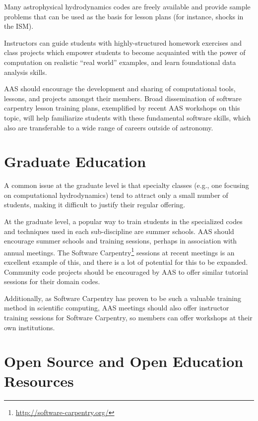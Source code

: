 \documentclass[11pt]{article}
\begin{document}
Many astrophysical hydrodynamics codes are freely available and
provide sample problems that can be used as the basis for lesson
plans (for instance, shocks in the ISM).

Instructors can guide students with highly-structured homework
exercises and class projects which empower students to become
acquainted with the power of computation on realistic ``real world''
examples, and learn foundational data analysis skills.

AAS should encourage the development and sharing of computational
tools, lessons, and projects amongst their members. Broad
dissemination of software carpentry lesson training plans, exemplified
by recent AAS workshops on this topic, will help familiarize students
with these fundamental software skills, which also are transferable to
a wide range of careers outside of astronomy.





\section{Graduate Education}

A common issue at the graduate level is that specialty classes (e.g.,
one focusing on computational hydrodynamics) tend to attract only a
small number of students, making it difficult to justify their regular
offering.

At the graduate level, a popular way to train students in the
specialized codes and techniques used in each sub-discipline are summer
schools.  AAS should encourage summer schools and training sessions,
perhaps in association with annual meetings.  The Software
Carpentry\footnote{\url{http://software-carpentry.org/}} sessions at
recent meetings is an excellent example of this, and there is a lot of
potential for this to be expanded.  Community code projects should be
encouraged by AAS to offer similar tutorial sessions for their domain
codes.

Additionally, as Software Carpentry has proven to be such a valuable
training method in scientific computing, AAS meetings should also
offer instructor training sessions for Software Carpentry, so members
can offer workshops at their own institutions.


\section{Open Source and Open Education Resources}
\end{document}
